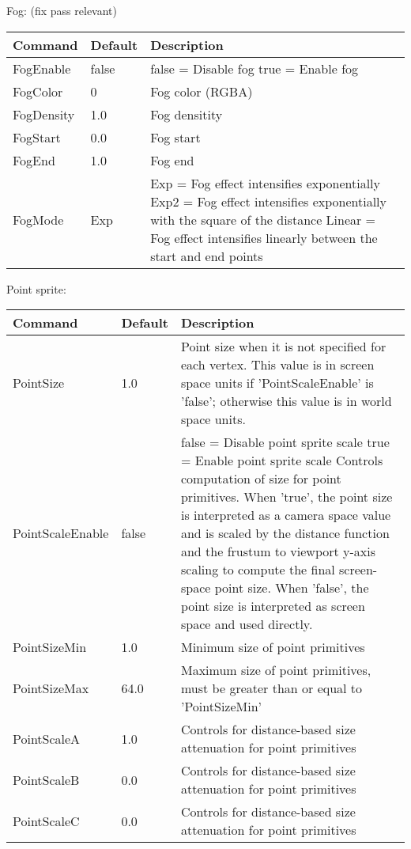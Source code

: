 Fog: (fix pass relevant)\\
\begin{tabular}{|p{4.5cm}|p{3cm}|p{9cm}|}
\hline
\textbf{Command} & \textbf{Default} & \textbf{Description}\\
\hline
FogEnable  & false & false = Disable fog\newline
                     true  = Enable fog\\
\hline
FogColor   & 0     & Fog color (RGBA)\\
\hline
FogDensity & 1.0   & Fog densitity\\
\hline
FogStart   & 0.0   & Fog start\\
\hline
FogEnd     & 1.0   & Fog end\\
\hline
FogMode    & Exp   & Exp    = Fog effect intensifies exponentially\newline
                     Exp2   = Fog effect intensifies exponentially with the square of the distance\newline
                     Linear = Fog effect intensifies linearly between the start and end points\\
\hline
\end{tabular}


Point sprite:\\
\begin{tabular}{|p{4.5cm}|p{3cm}|p{9cm}|}
\hline
\textbf{Command} & \textbf{Default} & \textbf{Description}\\
\hline
PointSize        & 1.0   & Point size when it is not specified for each vertex. This value is in screen space units 
                           if 'PointScaleEnable' is 'false'; otherwise this value is in world space units.\\
\hline
PointScaleEnable & false & false = Disable point sprite scale\newline
                           true  = Enable point sprite scale\newline
                           Controls computation of size for point primitives. When 'true', the point size is interpreted 
                           as a camera space value and is scaled by the distance function and the frustum to viewport 
                           y-axis scaling to compute the final screen-space point size. When 'false', the point size is 
                           interpreted as screen space and used directly.\\
\hline
PointSizeMin     & 1.0   & Minimum size of point primitives\\
\hline
PointSizeMax     & 64.0  & Maximum size of point primitives, must be greater than or equal to 'PointSizeMin'\\
\hline
PointScaleA      & 1.0   & Controls for distance-based size attenuation for point primitives\\
\hline
PointScaleB      & 0.0   & Controls for distance-based size attenuation for point primitives\\
\hline
PointScaleC      & 0.0   & Controls for distance-based size attenuation for point primitives\\
\hline
\end{tabular}


